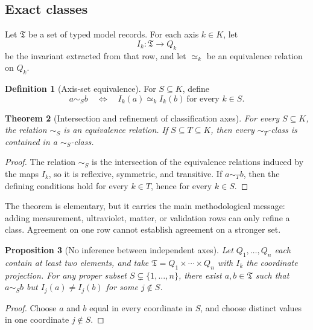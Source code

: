 \documentclass[11pt]{article}
\newtheorem{theorem}{Theorem}[section]
\newtheorem{proposition}[theorem]{Proposition}
\theoremstyle{definition}
\newtheorem{definition}[theorem]{Definition}
\theoremstyle{remark}
\begin{document}
\subsection{Exact classes}

Let \(\mathfrak T\) be a set of typed model records. For each axis
\(k\in K\), let
\[
 I_k:\mathfrak T\to Q_k
\]
be the invariant extracted from that row, and let \(\simeq_k\) be an
equivalence relation on \(Q_k\).

\begin{definition}[Axis-set equivalence]
For \(S\subseteq K\), define
\[
 a\sim_S b
 \quad\Longleftrightarrow\quad
 I_k(a)\simeq_k I_k(b)
 \ \text{for every }k\in S.
\]
\end{definition}

\begin{theorem}[Intersection and refinement of classification axes]
\label{thm:axis-refinement}
For every \(S\subseteq K\), the relation \(\sim_S\) is an equivalence
relation. If \(S\subseteq T\subseteq K\), then every \(\sim_T\)-class is
contained in a \(\sim_S\)-class.
\end{theorem}

\begin{proof}
The relation \(\sim_S\) is the intersection of the equivalence relations
induced by the maps \(I_k\), so it is reflexive, symmetric, and transitive.
If \(a\sim_T b\), then the defining conditions hold for every \(k\in T\),
hence for every \(k\in S\).
\end{proof}

The theorem is elementary, but it carries the main methodological message:
adding measurement, ultraviolet, matter, or validation rows can only refine a
class. Agreement on one row cannot establish agreement on a stronger set.

\begin{proposition}[No inference between independent axes]
\label{prop:no-cross-axis}
Let \(Q_1,\ldots,Q_n\) each contain at least two elements, and take
\(\mathfrak T=Q_1\times\cdots\times Q_n\) with \(I_k\) the coordinate
projection. For any proper subset \(S\subsetneq\{1,\ldots,n\}\), there exist
\(a,b\in\mathfrak T\) such that \(a\sim_S b\) but \(I_j(a)\neq I_j(b)\) for
some \(j\notin S\).
\end{proposition}

\begin{proof}
Choose \(a\) and \(b\) equal in every coordinate in \(S\), and choose distinct
values in one coordinate \(j\notin S\).
\end{proof}
\end{document}
